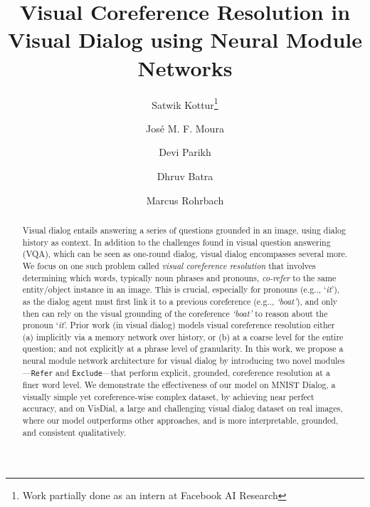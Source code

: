 \documentclass[runningheads]{llncs}
\makeatletter
\DeclareRobustCommand\onedot{\futurelet\@let@token\@onedot}
\def\@onedot{\ifx\@let@token.\else.\null\fi\xspace}
\def\eg{e.g\onedot} \def\Eg{E.g\onedot}
\makeatother
\begin{document}
\title{Visual Coreference Resolution in Visual Dialog using Neural Module Networks} 

\author{Satwik Kottur\thanks{Work partially done as an intern at Facebook AI Research} \and
Jos\'{e} M. F. Moura \and
Devi Parikh  \and
Dhruv Batra  \and
Marcus Rohrbach  }
\maketitle
\begin{abstract}
Visual dialog entails answering a series of questions grounded in an image, 
using dialog history as context.
In addition to the challenges found in visual question answering (VQA),
which can be seen as one-round dialog, visual dialog encompasses several more.
We focus on one such problem called \textit{visual coreference resolution} that
involves determining which words, typically noun phrases and pronouns, 
\textit{co-refer} to the same entity/object instance in an image.
This is crucial, especially for pronouns (\eg, `\textit{it}'), as the dialog agent
must first link it to a previous coreference (\eg, \textit{`boat'}), and only then
can rely on the visual grounding of the coreference \textit{`boat'} to reason about the
pronoun `\textit{it}'.
Prior work (in visual dialog) models visual coreference resolution either
(a) implicitly via a memory network over history, or 
(b) at a coarse level for the entire question;
and not explicitly at a phrase level of granularity.
In this work, we propose a neural module network architecture for visual dialog
by introducing two novel modules---\texttt{Refer} and \texttt{Exclude}---that
perform explicit, grounded, coreference resolution at a finer word level.
We demonstrate the effectiveness of our model on MNIST Dialog, a visually 
simple yet coreference-wise complex dataset,
by achieving near perfect accuracy, and on VisDial, a large and
challenging visual dialog dataset on real images, where our model 
outperforms other approaches, and is more interpretable, grounded, and 
consistent qualitatively.
\end{abstract}
\end{document}
